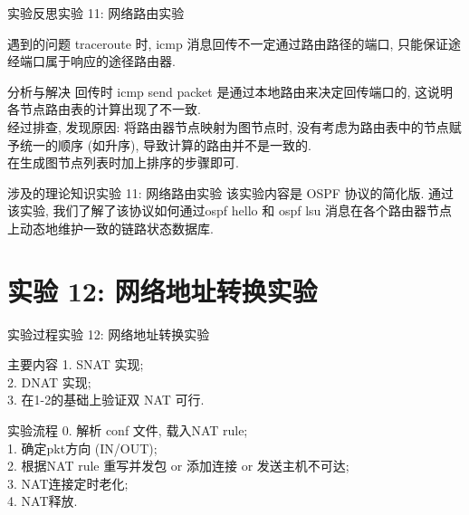 \documentclass{beamer}
\begin{document}
\begin{frame}{实验反思}{实验 11: 网络路由实验}
    \begin{block}{遇到的问题}
        traceroute 时, icmp 消息回传不一定通过路由路径的端口,
        只能保证途经端口属于响应的途径路由器.
    \end{block}
    \begin{block}{分析与解决}
        回传时 icmp send packet 是通过本地路由来决定回传端口的,
        这说明各节点路由表的计算出现了不一致.\\
        经过排查, 发现原因: 将路由器节点映射为图节点时,
        没有考虑为路由表中的节点赋予统一的顺序 (如升序),
        导致计算的路由并不是一致的.\\
        在生成图节点列表时加上排序的步骤即可.
    \end{block}
\end{frame}

\begin{frame}{涉及的理论知识}{实验 11: 网络路由实验}
    该实验内容是 OSPF 协议的简化版.
    通过该实验, 我们了解了该协议如何通过ospf hello 和 ospf lsu
    消息在各个路由器节点上动态地维护一致的链路状态数据库.
\end{frame}

\section{实验 12: 网络地址转换实验}
\begin{frame}
    \sectionpage
\end{frame}

\begin{frame}{实验过程}{实验 12: 网络地址转换实验}
    \begin{block}{主要内容}
        1. SNAT 实现;\\
        2. DNAT 实现;\\
        3. 在1-2的基础上验证双 NAT 可行.
    \end{block}

    \begin{block}{实验流程}
        0. 解析 conf 文件, 载入NAT rule;\\
        1. 确定pkt方向 (IN/OUT);\\
        2. 根据NAT rule 重写并发包 or
        添加连接 or 发送主机不可达;\\
        3. NAT连接定时老化;\\
        4. NAT释放.
    \end{block}
\end{frame}
\end{document}
